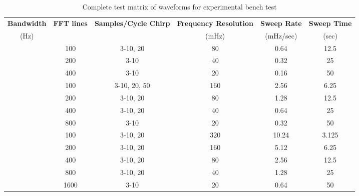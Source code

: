 \begin{table}[ht] %
  \centering
  \scriptsize %
  \caption{Complete test matrix of waveforms for experimental bench test}
    \begin{tabular}{cccccc}
    \toprule %
    \textbf{Bandwidth} & \textbf{FFT lines} & \textbf{Samples/Cycle Chirp} & \textbf{Frequency Resolution} & \textbf{Sweep Rate} & \textbf{Sweep Time} \\
	(Hz) 	& 		&	 		& (mHz) & (mHz/sec)	& (sec) \\ \midrule
\multirow{4}[8]{.5in}{\centering8}
		& 100		& 3-10, 20 		& 80    	& 0.64		& 12.5 \\ \cmidrule (l){2-6} %
		& 200		& 3-10 	     		& 40    	& 0.32 		& 25 \\ \cmidrule (l){2-6}
		& 400   	& 3-10  		& 20   	& 0.16  	& 50 \\ \midrule
%
\multirow{5}[8]{.5in}{\centering16}
		& 100   	& 3-10, 20, 50      	& 160   & 2.56  	& 6.25 \\ \cmidrule (l){2-6}
		& 200   	& 3-10, 20		& 80    	& 1.28  	& 12.5 \\ \cmidrule (l){2-6}
		& 400   	& 3-10, 20     		& 40    	& 0.64  	& 25 \\ \cmidrule (l){2-6}
		& 800		& 3-10      		 & 20    & 0.32  	& 50 \\ \midrule
%
\multirow{6}[12]{.5in}{\centering32}
		& 100   	& 3-10, 20     		 & 320	& 10.24 	& 3.125 \\ \cmidrule (l){2-6}
		& 200   	& 3-10, 20      		& 160	& 5.12  	& 6.25 \\ \cmidrule (l){2-6}
		& 400   	& 3-10, 20      		& 80	& 2.56  	& 12.5 \\ \cmidrule (l){2-6}
		& 800   	& 3-10, 20      		& 40	& 1.28 	 	& 25 \\ \cmidrule (l){2-6}
		& 1600  	& 3-10       		& 20	& 0.64  	& 50 \\ \bottomrule %
    \end{tabular}
  \label{tab:bench_test_matrix}
  \normalsize %
\end{table}
